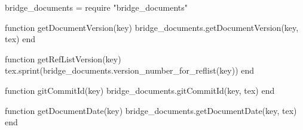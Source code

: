\begin{luacode}

  bridge_documents = require "bridge_documents"

  function getDocumentVersion(key)
    bridge_documents.getDocumentVersion(key, tex)
  end

  function getRefListVersion(key)
    tex.sprint(bridge_documents.version_number_for_reflist(key))
   end

  function gitCommitId(key)
    bridge_documents.gitCommitId(key, tex)
  end

  function getDocumentDate(key)
    bridge_documents.getDocumentDate(key, tex)
  end

\end{luacode}
